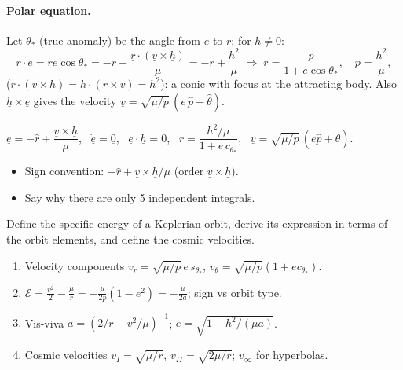 \paragraph{Polar equation.} Let $\theta_*$ (true anomaly) be the angle from $\underline e$ to $\underline r$; for $h\neq0$:
\begin{equation}
\underline r\cdot\underline e=re\cos\theta_*=-r+\frac{\underline r\cdot(\underline v\times\underline h)}{\mu}=-r+\frac{h^2}{\mu}
\;\Longrightarrow\; r=\frac{p}{1+e\cos\theta_*},\quad p=\frac{h^2}{\mu},
\end{equation}
($\underline r\cdot(\underline v\times\underline h)=\underline h\cdot(\underline r\times\underline v)=h^2$): a conic with focus at the attracting body.
Also $\underline h\times\underline e$ gives the velocity $\underline v=\sqrt{\mu/p}\,(e\,\hat p+\hat\theta)$.
\begin{keyf}
$\underline e=-\hat r+\dfrac{\underline v\times\underline h}{\mu}$, \ $\dot{\underline e}=\underline 0$, \ $\underline e\cdot\underline h=0$, \ $r=\dfrac{h^2/\mu}{1+e\,c_{\theta_*}}$, \ $\underline v=\sqrt{\mu/p}\,(e\hat p+\hat\theta)$.
\end{keyf}
\pitfalls
\begin{itemize}
\item Sign convention: $-\hat r+\underline v\times\underline h/\mu$ (order $\underline v\times\underline h$).
\item Say why there are only 5 independent integrals.
\end{itemize}

\begin{qbox}
Define the specific energy of a Keplerian orbit, derive its expression in terms of the orbit elements, and define the cosmic velocities.
\end{qbox}
\begin{outline}
\begin{enumerate}
\item Velocity components $v_r=\sqrt{\mu/p}\,e\,s_{\theta_*}$, $v_\theta=\sqrt{\mu/p}(1+ec_{\theta_*})$.
\item $\mathcal E=\frac{v^2}{2}-\frac{\mu}{r}=-\frac{\mu}{2p}(1-e^2)=-\frac{\mu}{2a}$; sign vs orbit type.
\item Vis-viva $a=(2/r-v^2/\mu)^{-1}$; $e=\sqrt{1-h^2/(\mu a)}$.
\item Cosmic velocities $v_I=\sqrt{\mu/r}$, $v_{II}=\sqrt{2\mu/r}$; $v_\infty$ for hyperbolas.
\end{enumerate}
\end{outline}
\answer
